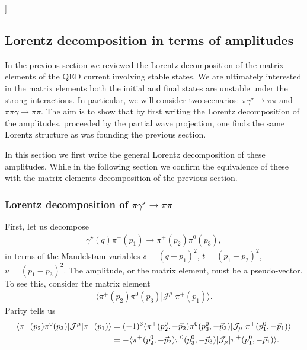 { }

{\raul [compare with the equation appearing in page 18 of arXiv:0902.2241v1 [hep-ph]]}

 \subsection{Lorentz decomposition in terms of amplitudes \label{sec:Lorentz_amps}}
In the previous section we reviewed the Lorentz decomposition of the matrix elements of the QED current involving stable states. We are ultimately interested in the matrix elements both the initial and final states are unstable under the strong interactions. In particular, we will consider two scenarios: $\pi\gamma^\star\to\pi\pi$ and $\pi\pi\gamma\to\pi\pi$. The aim is to show that by first writing the Lorentz decomposition of the amplitudes, proceeded by the partial wave projection, one finds the same Lorentz structure as was founding the previous section. 

In this section we first write the general Lorentz decomposition of these amplitudes. While in the following section we confirm the equivalence of these with the matrix elements decomposition of the previous section. 

\subsubsection{Lorentz decomposition of $\pi\gamma^\star\to\pi\pi$}
{} 
\label{sec:gpi_to_pipi}

First, let us decompose 
\begin{align}
\gamma^\star(q)\pi^+(p_1)\to\pi^+(p_2)\pi^0(p_3),
\end{align}
in terms of the Mandelstam variables $s=(q+p_1)^2$, $t=(p_1-p_2)^2$, $u=(p_1-p_3)^2$. The amplitude, or the matrix element, must be a pseudo-vector. To see this, consider the matrix element
\begin{align}
\langle \pi^+(p_2)\pi^0(p_3)|\mathcal{J}^\mu|\pi^+(p_1)\rangle.
\end{align}
Parity tells us 
\begin{align}
\langle \pi^+(p_2)\pi^0(p_3)|\mathcal{J}^\mu|\pi^+(p_1)\rangle
&=
(-1)^3\langle \pi^+(p_2^0,-\vec{p}_2)\pi^0(p_3^0,-\vec{p}_3)|\mathcal{J}_\mu|\pi^+(p_1^0,-\vec{p}_1)\rangle
\nonumber\\
&=
-\langle \pi^+(p_2^0,-\vec{p}_2)\pi^0(p_3^0,-\vec{p}_3)|\mathcal{J}_\mu|\pi^+(p_1^0,-\vec{p}_1)\rangle.
\end{align} 

